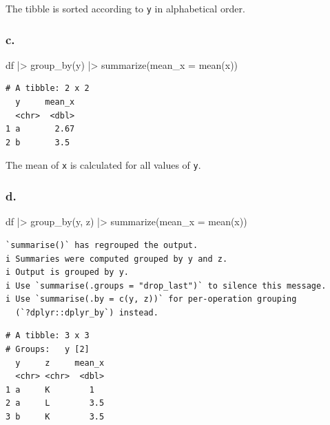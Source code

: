 \documentclass[
  letterpaper,
  DIV=11,
  numbers=noendperiod]{scrreprt}
\newenvironment{Shaded}{\begin{snugshade}}{\end{snugshade}}
\newcommand{\AttributeTok}[1]{\textcolor[rgb]{0.40,0.45,0.13}{#1}}
\newcommand{\FunctionTok}[1]{\textcolor[rgb]{0.28,0.35,0.67}{#1}}
\newcommand{\NormalTok}[1]{\textcolor[rgb]{0.00,0.23,0.31}{#1}}
\newcommand{\SpecialCharTok}[1]{\textcolor[rgb]{0.37,0.37,0.37}{#1}}
\begin{document}
The tibble is sorted according to \texttt{y} in alphabetical order.

\subsubsection{c.}\label{c.}

\begin{Shaded}
\begin{Highlighting}[]
\NormalTok{df }\SpecialCharTok{|\textgreater{}}
  \FunctionTok{group\_by}\NormalTok{(y) }\SpecialCharTok{|\textgreater{}}
  \FunctionTok{summarize}\NormalTok{(}\AttributeTok{mean\_x =} \FunctionTok{mean}\NormalTok{(x))}
\end{Highlighting}
\end{Shaded}

\begin{verbatim}
# A tibble: 2 x 2
  y     mean_x
  <chr>  <dbl>
1 a       2.67
2 b       3.5 
\end{verbatim}

The mean of \texttt{x} is calculated for all values of \texttt{y}.

\subsubsection{d.}\label{d.}

\begin{Shaded}
\begin{Highlighting}[]
\NormalTok{df }\SpecialCharTok{|\textgreater{}}
  \FunctionTok{group\_by}\NormalTok{(y, z) }\SpecialCharTok{|\textgreater{}}
  \FunctionTok{summarize}\NormalTok{(}\AttributeTok{mean\_x =} \FunctionTok{mean}\NormalTok{(x))}
\end{Highlighting}
\end{Shaded}

\begin{verbatim}
`summarise()` has regrouped the output.
i Summaries were computed grouped by y and z.
i Output is grouped by y.
i Use `summarise(.groups = "drop_last")` to silence this message.
i Use `summarise(.by = c(y, z))` for per-operation grouping
  (`?dplyr::dplyr_by`) instead.
\end{verbatim}

\begin{verbatim}
# A tibble: 3 x 3
# Groups:   y [2]
  y     z     mean_x
  <chr> <chr>  <dbl>
1 a     K        1  
2 a     L        3.5
3 b     K        3.5
\end{verbatim}
\end{document}

